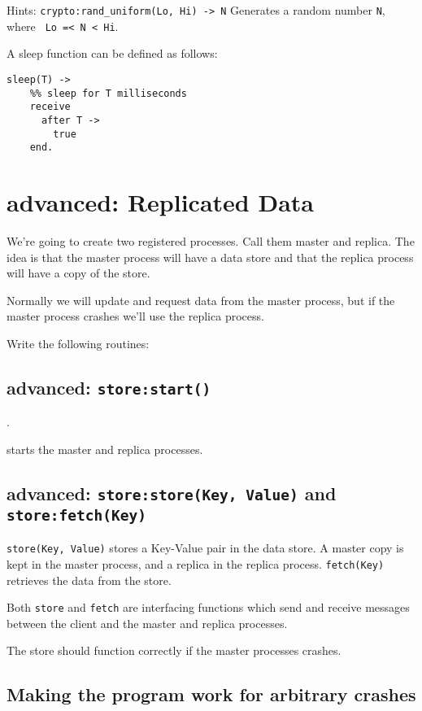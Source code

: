\documentclass[12pt]{hitec}
\begin{document}
Hints: \verb+crypto:rand_uniform(Lo, Hi) -> N+
Generates a random number \verb+N+, where \verb+ Lo =< N < Hi+.

A sleep function can be defined as follows:

\begin{Verbatim}
sleep(T) ->
    %% sleep for T milliseconds
    receive
      after T ->
        true
    end.
\end{Verbatim}



\section{advanced: Replicated Data}

We're going to create two registered processes. Call them master and replica.
The idea is that the master process will have a data store and that
the replica process will have a copy of the store.

Normally we will update and request data from the master process, but
if the master process crashes we'll use the replica process.

Write the following routines:

\subsection{advanced: \texttt{store:start()}}.

starts the master and replica processes.

\subsection{advanced: \texttt{store:store(Key, Value)} and \texttt{store:fetch(Key)}}

\verb+store(Key, Value)+ stores a Key-Value pair in the data store.  A
master copy is kept in the master process, and a replica in the
replica process. \verb+fetch(Key)+ retrieves the data from the store.

Both \verb+store+ and \verb+fetch+ are interfacing functions which
send and receive messages between the client and the master and
replica processes.

The store should function correctly if the master processes crashes.

\subsection*{Making the program work for arbitrary crashes}
\end{document}
